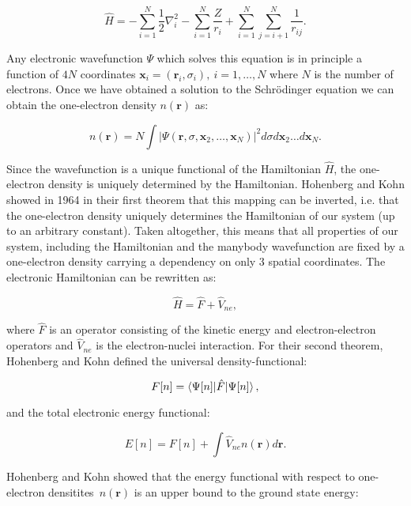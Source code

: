 \begin{equation}
    \hat{H} = -\sum_{i=1}^N \frac{1}{2} \nabla_i^2
    - \sum_{i=1}^N \frac{Z}{r_{i}} + \sum_{i=1}^N \sum_{j=i+1}^N
    \frac{1}{r_{ij}} .
\end{equation}

Any electronic wavefunction $\Psi$ which solves this equation
is in principle a function of $4N$ coordinates $\bm{x}_i = (\bm{r}_i, \sigma_i)
, \ i=1,\dots,N$
where $N$ is the number of electrons.
Once we have obtained a solution to the Schr\"{o}dinger equation
we can obtain the one-electron density $n(\bm{r})$ as:

\begin{equation}
    n(\bm{r}) = N \int \left| \Psi(\bm{r}, \sigma, \bm{x}_2,\dots,\bm{x}_N)
    \right|^2 d\sigma d\bm{x}_2 \dots d\bm{x}_N .
\end{equation}

Since the wavefunction is a unique functional of the Hamiltonian
$\hat{H}$, the one-electron density is uniquely determined
by the Hamiltonian. Hohenberg and Kohn showed in 1964
\cite{hohenberg1964inhomogeneous} in their first theorem that this mapping
can be inverted, i.e. that the one-electron density uniquely
determines the Hamiltonian of our system (up to an arbitrary constant).
Taken altogether, this means that all properties of our system, including
the Hamiltonian and the manybody wavefunction are fixed
by a one-electron density carrying a dependency on only 3 spatial coordinates.
The electronic Hamiltonian can be rewritten as:

\begin{equation}
 \hat{H} = \hat{F} + \hat{V}_{ne} , 
\end{equation}

where $\hat{F}$ is an operator consisting of the kinetic energy
and electron-electron operators and $\hat{V}_{ne}$
is the electron-nuclei interaction.
For their second theorem, Hohenberg and Kohn defined
the universal density-functional:

\begin{equation}
 F[n] = \braket{\Psi[n] | \hat{F} | \Psi[n]} , 
\end{equation}

and the total electronic energy functional:

\begin{equation}
 E[n] = F[n] + \int \hat{V}_{ne} n(\bm{r}) d\bm{r} . 
\end{equation}

Hohenberg and Kohn showed that the energy functional
with respect to one-electron densitites $n(\bm{r})$
is an upper bound to the ground state energy:

